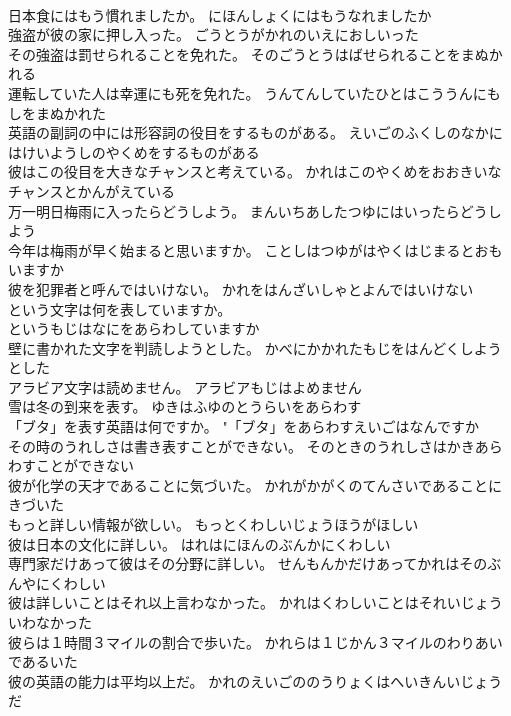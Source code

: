 \documentclass[8pt]{extreport}
\begin{document}
\begin{CJK}{UTF8}{min}
\\	日本食にはもう慣れましたか。	にほんしょくにはもうなれましたか 
\\	強盗が彼の家に押し入った。	ごうとうがかれのいえにおしいった 
\\	その強盗は罰せられることを免れた。	そのごうとうはばせられることをまぬかれる 
\\	運転していた人は幸運にも死を免れた。	うんてんしていたひとはこううんにもしをまぬかれた 
\\	英語の副詞の中には形容詞の役目をするものがある。	えいごのふくしのなかにはけいようしのやくめをするものがある 
\\	彼はこの役目を大きなチャンスと考えている。	かれはこのやくめをおおきいなチャンスとかんがえている 
\\	万一明日梅雨に入ったらどうしよう。	まんいちあしたつゆにはいったらどうしよう 
\\	今年は梅雨が早く始まると思いますか。	ことしはつゆがはやくはじまるとおもいますか 
\\	彼を犯罪者と呼んではいけない。	かれをはんざいしゃとよんではいけない 
\\	という文字は何を表していますか。	
\\	というもじはなにをあらわしていますか 
\\	壁に書かれた文字を判読しようとした。	かべにかかれたもじをはんどくしようとした 
\\	アラビア文字は読めません。	アラビアもじはよめません 
\\	雪は冬の到来を表す。	ゆきはふゆのとうらいをあらわす 
\\	「ブタ」を表す英語は何ですか。	"「ブタ」をあらわすえいごはなんですか 
\\	その時のうれしさは書き表すことができない。	そのときのうれしさはかきあらわすことができない 
\\	彼が化学の天才であることに気づいた。	かれがかがくのてんさいであることにきづいた 
\\	もっと詳しい情報が欲しい。	もっとくわしいじょうほうがほしい 
\\	彼は日本の文化に詳しい。	はれはにほんのぶんかにくわしい 
\\	専門家だけあって彼はその分野に詳しい。	せんもんかだけあってかれはそのぶんやにくわしい 
\\	彼は詳しいことはそれ以上言わなかった。	かれはくわしいことはそれいじょういわなかった 
\\	彼らは１時間３マイルの割合で歩いた。	かれらは１じかん３マイルのわりあいであるいた 
\\	彼の英語の能力は平均以上だ。	かれのえいごののうりょくはへいきんいじょうだ 

\end{CJK}
\end{document}
